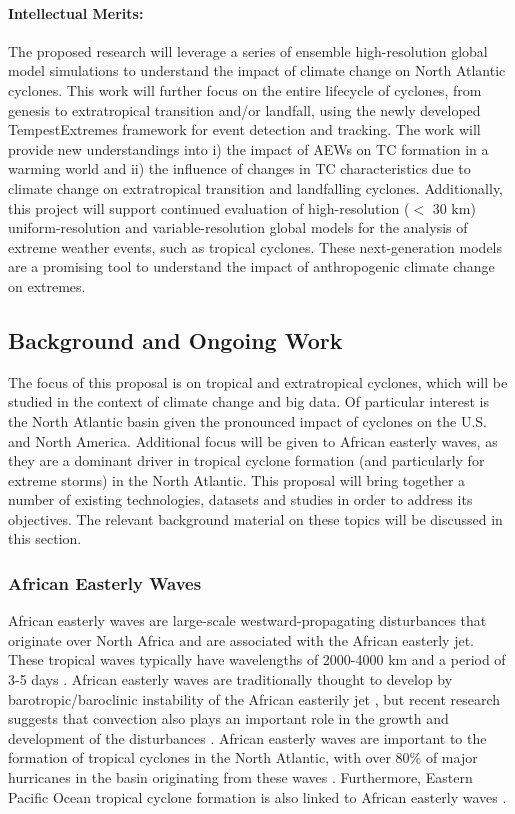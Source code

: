 \documentclass[11pt]{article}
\begin{document}
\paragraph{Intellectual Merits:}  

The proposed research will leverage a series of ensemble high-resolution global model simulations to understand the impact of climate change on North Atlantic cyclones. This work will further focus on the entire lifecycle of cyclones, from genesis to extratropical transition and/or landfall, using the newly developed TempestExtremes framework for event detection and tracking.  The work will provide new understandings into i) the impact of AEWs on TC formation in a warming world and ii) the influence of changes in TC characteristics due to climate change on extratropical transition and landfalling cyclones. Additionally, this project will support continued evaluation of high-resolution ($<$ 30 km) uniform-resolution and variable-resolution global models for the analysis of extreme weather events, such as tropical cyclones. These next-generation models are a promising tool to understand the impact of anthropogenic climate change on extremes.  

\subsection{Background and Ongoing Work} \label{sec:BackgroundOngoingWork}

The focus of this proposal is on tropical and extratropical cyclones, which will be studied in the context of climate change and big data.  Of particular interest is the North Atlantic basin given the pronounced impact of cyclones on the U.S. and North America. Additional focus will be given to African easterly waves, as they are a dominant driver in tropical cyclone formation (and particularly for extreme storms) in the North Atlantic. This proposal will bring together a number of existing technologies, datasets and studies in order to address its objectives.  The relevant background material on these topics will be discussed in this section.

\subsubsection{African Easterly Waves}
African easterly waves are large-scale westward-propagating disturbances that originate over North Africa and are associated with the African easterly jet. These tropical waves typically have wavelengths of 2000-4000 km and a period of 3-5 days \citep{Burpee1974,Reed1977}. African easterly waves are traditionally thought to develop by barotropic/baroclinic instability of the African easterily jet \citep{Burpee1972}, but recent research suggests that convection also plays an important role in the growth and development of the disturbances \citep{Hall2006,Thorncroft2008,Hsieh&Cook2005,Berry&Thorncroft2012}. African easterly waves are important to the formation of tropical cyclones in the North Atlantic, with over 80$\%$ of major hurricanes in the basin originating from these waves \citep{Landsea1993}. Furthermore, Eastern Pacific Ocean tropical cyclone formation is also linked to African easterly waves \citep{Avila&Pasch1995}. 
\end{document}
